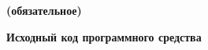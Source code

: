 \label{sec:sources}
\begin{center}
\vspace{-1em}
\textbf{ (обязательное)}

\textbf{Исходный код программного средства}
\end{center}



